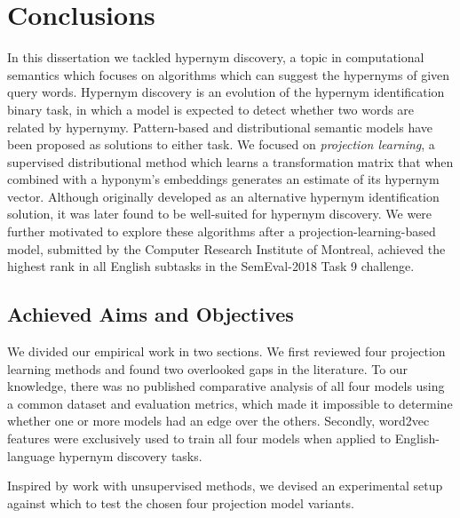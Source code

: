 \chapter{Conclusions}
In this dissertation we tackled hypernym discovery, a topic in computational semantics which focuses on algorithms which can suggest the hypernyms of given query words.  Hypernym discovery is an evolution of the hypernym identification binary task, in which a model is expected to detect whether two words are related by hypernymy.  Pattern-based and distributional semantic models have been proposed as solutions to either task.  We focused on \textit{projection learning}, a supervised distributional method which learns a transformation matrix that when combined with a hyponym's embeddings generates an estimate of its hypernym vector.  Although originally developed as an alternative hypernym identification solution, it was later found to be well-suited for hypernym discovery.  We were further motivated to explore these algorithms after a  projection-learning-based model, submitted by the Computer Research Institute of Montreal, achieved the highest rank in all English subtasks in the SemEval-2018 Task 9 challenge.

\section{Achieved Aims and Objectives}
We divided our empirical work in two sections.  We first reviewed four projection learning methods and found two overlooked gaps in the literature.  To our knowledge, there was no published comparative analysis of all four models using a common dataset and evaluation metrics, which made it impossible to determine whether one or more models had an edge over the others.  Secondly, word2vec features were exclusively used to train all four models when applied to English-language hypernym discovery tasks.

Inspired by \citet{shwartz2017siege} work with unsupervised methods, we devised an experimental setup against which to test the chosen four projection model variants.  


